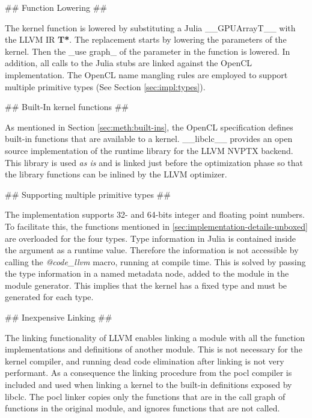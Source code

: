 \begin{markdown}
## Function Lowering ##

The kernel function is lowered by substituting a Julia __GPUArray{T}__
with the LLVM IR \textbf{T*}. The replacement starts by lowering the
parameters of the kernel. Then the _use graph_ of the parameter in the
function is lowered. In addition, all calls to the Julia stubs are
linked against the OpenCL implementation. The OpenCL name mangling
rules are employed to support multiple primitive types (See Section
\ref{sec:impl:types}).

## Built-In kernel functions ##

As mentioned in Section \ref{sec:meth:built-ins}, the OpenCL
specification defines built-in functions that are available to a
kernel. __libclc__ \cite{libclc} provides an open source
implementation of the runtime library for the LLVM NVPTX backend. This
library is used \textit{as is} and is linked just before the
optimization phase so that the library functions can be inlined by the
LLVM optimizer.

## Supporting multiple primitive types ##
\label{sec:impl:types}

The implementation supports 32- and 64-bits integer and floating point
numbers. To facilitate this, the functions mentioned in
\ref{sec:implementation-details-unboxed} are overloaded for the four
types. Type information in Julia is contained inside the argument as a
runtime value. Therefore the information is not accessible by calling
the \textit{@code\_llvm} macro, running at compile time. This is solved
by passing the type information in a named metadata node, added to the
module in the module generator. This implies that the kernel has a
fixed type and must be generated for each type.

## Inexpensive Linking ##

The linking functionality of \gls{LLVM} enables linking a module with
all the function implementations and definitions of another
module. This is not necessary for the kernel compiler, and running dead
code elimination after linking is not very performant. As a
consequence the linking procedure from the \gls{pocl} \cite{pocl} compiler is
included and used when linking a kernel to the built-in definitions
exposed by libclc. The \gls{pocl} linker copies only the functions
that are in the call graph of functions in the original module, and
ignores functions that are not called.

\end{markdown}
